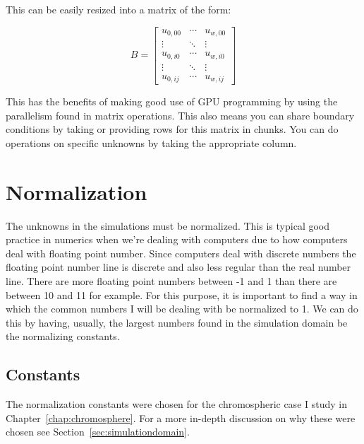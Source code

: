 \documentclass[12pt,upcase]{umlthesis}
\begin{document}
This can be easily resized into a matrix of the form:

\begin{equation}
	B =
	\begin{bmatrix}
		u_{0,00} & \cdots  & u_{w,00} \\
		\vdots   & \ddots & \vdots \\
		u_{0,i0} & \cdots & u_{w,i0} \\
		\vdots   & \ddots & \vdots \\
		u_{0,ij} & \cdots  & u_{w,ij}
	\end{bmatrix}
\end{equation}

This has the benefits of making good use of GPU programming by using the parallelism found in matrix operations. This also means you can share boundary conditions by taking or providing rows for this matrix in chunks. You can do operations on specific unknowns by taking the appropriate column.

\section{Normalization}\label{sec:normalization}

The unknowns in the simulations must be normalized. This is typical good practice in numerics when we're dealing with computers due to how computers deal with floating point number. Since computers deal with discrete numbers the floating point number line is discrete and also less regular than the real number line. There are more floating point numbers between -1 and 1 than there are between 10 and 11 for example. For this purpose, it is important to find a way in which the common numbers I will be dealing with be normalized to 1. We can do this by having, usually, the largest numbers found in the simulation domain be the normalizing constants.

\subsection{Constants}\label{sec:normconstants}

The normalization constants were chosen for the chromospheric case I study in Chapter~\ref{chap:chromosphere}. For a more in-depth discussion on why these were chosen see Section~\ref{sec:simulationdomain}.
\end{document}
